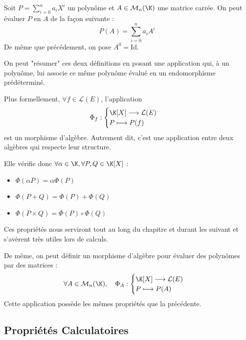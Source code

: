 \begin{definition}
    Soit $P = \sum_{i=0}^{n} a_i X^i$ un polynôme et $A \in \mathcal{M}_n(\K)$ une matrice carrée. 
    On peut évaluer $P$ en $A$ de la façon suivante :
        \[P(A) = \sum_{i=0}^{n} a_i A^i\]
    De même que précédement, on pose $A^0 = \text{Id}$.
\end{definition}


\begin{proposition}
    On peut "résumer" ces deux définitions en posant une application qui, à un polynôme, lui associe ce même polynôme évalué 
    en un endomorphisme prédéterminé. 

    Plus formellement, $ \forall f \in \mathcal{L}(E)$, l'application 
        \[ \Phi_f : 
            \begin{cases}
                \K[X] \longrightarrow \mathcal{L}(E) \\ 
                P \longmapsto P(f)
            \end{cases}
        \]
    est un morphisme d'algèbre. Autrement dit, c'est une application entre deux algèbres qui respecte leur structure. 
    
    Elle vérifie donc $ \forall \alpha \in \K, \forall P,Q \in \K[X]$ :
    \begin{itemize}
        \item $\Phi(\alpha P) = \alpha \Phi(P)$ 
        \item $\Phi(P+Q) = \Phi(P) + \Phi(Q)$ 
        \item $\Phi(P \times Q) = \Phi(P) \circ \Phi(Q)$ 
    \end{itemize}
    Ces propriétés nous serviront tout au long du chapitre et durant les suivant et s'avèrent très utiles lors de calculs. 
\end{proposition}

\begin{remark}
    De même, on peut définir un morphisme d'algèbre pour évaluer des polynômes par des matrices :
        \[ \forall A \in \mathcal{M}_n(\K), \quad \Phi_A : 
            \begin{cases}
                \K[X] \longrightarrow \mathcal{L}(E) \\ 
                P \longmapsto P(A)
            \end{cases}
        \]
    Cette application possède les mêmes propriétés que la précédente. 
\end{remark}


\subsection{Propriétés Calculatoires}

